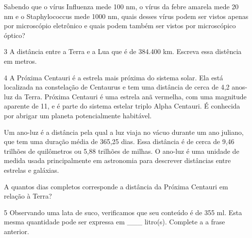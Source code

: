 Sabendo que o vírus Influenza mede 100 nm, o vírus da febre amarela mede 20 nm e
o Staphylococcus mede 1000 nm, quais desses vírus podem ser vistos apenas por 
microscópio eletrônico e quais podem também ser vistos por microscópico óptico?

\begin{emptybox}
\end{emptybox}

\pagebreak
\num{3} A distância entre a Terra e a Lua que é de 384.400 km. Escreva essa distência
em metros.

\begin{emptybox}
\end{emptybox}

\num{4} A Próxima Centauri é a estrela mais próxima do sistema solar. Ela está localizada
na constelação de Centaurus e tem uma distância de cerca de 4,2 anos-luz da Terra. Próxima
Centauri é uma estrela anã vermelha, com uma magnitude aparente de 11, e é parte do
sistema estelar triplo Alpha Centauri. É conhecida por abrigar um planeta potencialmente 
habitável.

Um ano-luz é a distância pela qual a luz viaja no vácuo durante um ano
juliano, que tem uma duração média de 365,25 dias. Essa distância é de
cerca de 9,46 trilhões de quilômetros ou 5,88 trilhões de milhas. O
ano-luz é uma unidade de medida usada principalmente em astronomia para
descrever distâncias entre estrelas e galáxias.

A quantos dias completos corresponde a distância da Próxima Centauri em relação à Terra?

\begin{emptybox}
\end{emptybox}

\num{5} Observando uma lata de suco, verificamos que seu conteúdo é de 355
ml. Esta mesma quantidade pode ser expressa em \_\_\_ litro(s). Complete
a a frase anterior.

